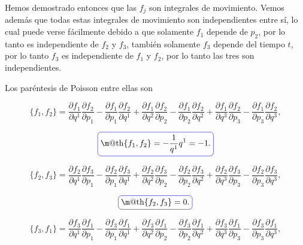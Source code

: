 \documentclass[a4paper,10pt]{article}
\makeatletter
\numberwithin{equation}{section}
\newcommand*{\boxcolor}{blue}
\renewcommand{\boxed}[1]{\textcolor{\boxcolor}{%
\tikz[baseline={([yshift=-1ex]current bounding box.center)}] \node [rectangle, minimum width=1ex,rounded corners,draw] {\normalcolor\m@th$\displaystyle#1$};}}
\makeatother
\begin{document}
Hemos demostrado entonces que las $f_j$ son integrales de movimiento. Vemos además que 
todas estas integrales de movimiento son independientes entre sí, lo cual puede verse 
fácilmente debido a que solamente $f_1$ depende de $p_2$, por lo tanto es independiente 
de $f_2$ y $f_3$, también solamente $f_3$ depende del tiempo $t$, por lo tanto 
$f_3$ es independiente de $f_1$ y $f_2$, por lo tanto las tres son independientes.

\vspace{.3cm}

Los paréntesis de Poisson entre ellas son

\begin{equation}
 \{f_1,f_2\} = \frac{\partial f_1}{\partial q^1}\frac{\partial f_2}{\partial p_1} - 
 \frac{\partial f_1}{\partial p_1}\frac{\partial f_2}{\partial q^1} +  \frac{\partial f_1}{\partial q^2}\frac{\partial f_2}{\partial p_2} - 
 \frac{\partial f_1}{\partial p_2}\frac{\partial f_2}{\partial q^2} +  \frac{\partial f_1}{\partial q^3}\frac{\partial f_2}{\partial p_3} - 
 \frac{\partial f_1}{\partial p_3}\frac{\partial f_2}{\partial q^3},
\end{equation}

\begin{equation}
 \boxed{ \{f_1,f_2\} = - \frac{1}{q^1}q^1 = -1. }
\end{equation}

\begin{equation}
 \{f_2,f_3\} = \frac{\partial f_2}{\partial q^1}\frac{\partial f_3}{\partial p_1} - 
 \frac{\partial f_2}{\partial p_1}\frac{\partial f_3}{\partial q^1} +  \frac{\partial f_2}{\partial q^2}\frac{\partial f_3}{\partial p_2} - 
 \frac{\partial f_2}{\partial p_2}\frac{\partial f_3}{\partial q^2} +  \frac{\partial f_2}{\partial q^3}\frac{\partial f_3}{\partial p_3} - 
 \frac{\partial f_2}{\partial p_3}\frac{\partial f_3}{\partial q^3},
\end{equation}

\begin{equation}
 \boxed{ \{f_2,f_3\} = 0 .}
\end{equation}

\begin{equation}
 \{f_3,f_1\} = \frac{\partial f_3}{\partial q^1}\frac{\partial f_1}{\partial p_1} - 
 \frac{\partial f_3}{\partial p_1}\frac{\partial f_1}{\partial q^1} +  \frac{\partial f_3}{\partial q^2}\frac{\partial f_1}{\partial p_2} - 
 \frac{\partial f_3}{\partial p_2}\frac{\partial f_1}{\partial q^2} +  \frac{\partial f_3}{\partial q^3}\frac{\partial f_1}{\partial p_3} - 
 \frac{\partial f_3}{\partial p_3}\frac{\partial f_1}{\partial q^3},
\end{equation}
\end{document}
